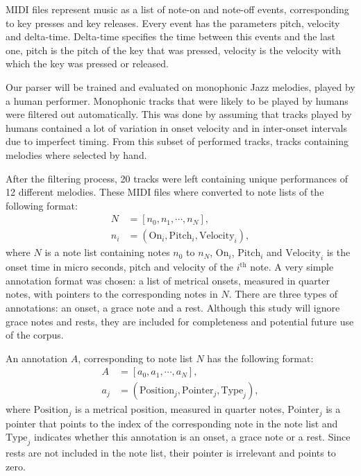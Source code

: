 MIDI files represent music as a list of note-on and note-off events, corresponding to key presses and key releases. Every event has the parameters pitch, velocity and delta-time. Delta-time specifies the time between this events and the last one, pitch is the pitch of the key that was pressed, velocity is the velocity with which the key was pressed or released.

Our parser will be trained and evaluated on monophonic Jazz melodies, played by a human performer. Monophonic tracks that were likely to be played by humans were filtered out automatically. This was done by assuming that tracks played by humans contained a lot of variation in onset velocity and in inter-onset intervals due to imperfect timing. From this subset of performed tracks, tracks containing melodies where selected by hand.

After the filtering process, 20 tracks were left containing unique performances of 12 different melodies. These MIDI files where converted to note lists of the following format:
\begin{align*}
N &= [n_0, n_1, \cdots, n_N],\\
n_i &= (\mathrm{On}_i, \mathrm{Pitch}_i, \mathrm{Velocity}_i),
\end{align*}
where $N$ is a note list containing notes $n_0$ to $n_N$, $\mathrm{On}_i$, $\mathrm{Pitch}_i$ and $\mathrm{Velocity}_i$ is the onset time in micro seconds, pitch and velocity of the $i^{\mathrm{th}}$ note. A very simple annotation format was chosen: a list of metrical onsets, measured in quarter notes, with pointers to the corresponding notes in $N$. There are three types of annotations: an onset, a grace note and a rest. Although this study will ignore grace notes and rests, they are included for completeness and potential future use of the corpus.

An annotation $A$, corresponding to note list $N$ has the following format:
\begin{align*}
A &= [a_0, a_1, \cdots, a_N],\\
a_j &= (\mathrm{Position}_j, \mathrm{Pointer}_j, \mathrm{Type}_j),
\end{align*}
where $\mathrm{Position}_j$ is a metrical position, measured in quarter notes, $\mathrm{Pointer}_j$ is a pointer that points to the index of the corresponding note in the note list and $\mathrm{Type}_j$ indicates whether this annotation is an onset, a grace note or a rest. Since rests are not included in the note list, their pointer is irrelevant and points to zero. 

